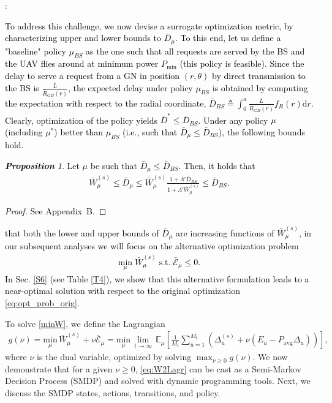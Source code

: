 \documentclass[12pt, draftcls, onecolumn]{IEEEtran}
\theoremstyle{plain}
\theoremstyle{definition}
\theoremstyle{remark}
\newtheorem{prop}{\textbf{Proposition}}
\newcommand\hlt[1]{\textcolor{black}{#1}}
\begin{document}
\noindent{\textbf{\hlt{Alternative Problem Formulation}}}:\label{altopt} \hlt{
To address this challenge, we now devise a surrogate optimization metric, by characterizing upper and lower bounds to $\bar D_{\mu}$. To this end, let us define a "baseline" policy $\mu_{BS}$ as the one such that all requests are served by the BS and the UAV flies around at minimum power $P_{\min}$ (this policy is feasible). Since the delay to serve a request from a GN in position $(r,\theta)$ by direct transmission to the BS is $\frac{L}{\bar R_{GB}(r)}$,  the expected delay under policy $\mu_{BS}$ is obtained by computing the expectation with respect to the radial coordinate, $\bar{D}_{BS}{\triangleq}\int_{0}^{a}\frac{L}{\bar{R}_{GB}(r)}f_{R}(r)\mathrm{d}r$. Clearly, optimization of the policy yields $\bar{D}^{*}{\leq}\bar{D}_{BS}$. Under any policy $\mu$ (including $\mu^*$) better than 
$\mu_{BS}$ (i.e., such that $\bar{D}_{\mu}\leq\bar{D}_{BS}$), the following bounds hold.
\begin{prop}\label{P2}
    Let $\mu$ be such that $\bar{D}_{\mu}\leq\bar{D}_{BS}$. Then, it holds that
    \begin{align}\label{bounds}
        \bar{W}_{\mu}^{(s)} \leq \bar{D}_{\mu} \leq \bar{W}_{\mu}^{(s)} \frac{1 + \Lambda' \bar{D}_{BS}}{1 + \Lambda' \bar{W}_{\mu}^{(s)}} \leq \bar{D}_{BS}.
    \end{align}
\end{prop}
\begin{proof}
    See Appendix~B.
\end{proof}
\noindent{Noticing} that both the lower and upper bounds of $\bar{D}_{\mu}$ are increasing functions of $\bar{W}_{\mu}^{(s)}$, in our subsequent analyses we will focus on the alternative  optimization problem
\begin{align}
\label{minW}
   \underset{\mu}{\mathrm{min}} \; \bar{W}_{\mu}^{(s)} \; \mathrm{ s.t. } \; \bar{\mathcal E}_{\mu} \leq 0.
\end{align}
In Sec. \ref{S6} (see Table \ref{T4}), we show that this alternative formulation leads to a near-optimal solution with respect to the original optimization \eqref{eq:opt_prob_orig}.}
To solve \eqref{minW}, we define the Lagrangian
\begin{align}\label{eq:W2Lagr}
    g(\nu) = \underset{\mu}{\mathrm{min}}\, \bar{W}_{\mu}^{(s)} + \nu\bar{\mathcal E}_{\mu} = \underset{\mu}{\mathrm{min}}\, \lim_{t\rightarrow\infty} \, \mathbb{E}_{\mu} \left[\frac{1}{M_t} \sum_{u=1}^{M_t}\left(\Delta_u^{(s)} + \nu (E_u{-}P_{\mathrm{avg}}\Delta_u)\right)\right],
\end{align}
where $\nu$ is the dual variable, optimized by solving $\max_{\nu{\geq}0}g(\nu)$. We now demonstrate that for a given $\nu{\geq}0$, \eqref{eq:W2Lagr} can be cast as a Semi-Markov Decision Process (SMDP) and solved with dynamic programming tools. Next, we discuss the SMDP states, actions, transitions, and policy. 
\end{document}
